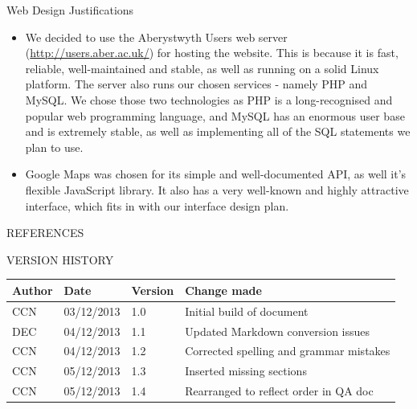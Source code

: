 \documentclass{article}
\newcommand{\versionhistory}{
		\begin{tabularx}{\linewidth}{| p{2cm} | p{2cm} | p{2cm} | X | }
			\hline
			\bf{Author} & \bf{Date} & \bf{Version} & \bf{Change made} \\
			\hline
			CCN & 03/12/2013 & 1.0 & Initial build of document \\
			\hline
			DEC & 04/12/2013 & 1.1 & Updated Markdown conversion issues \\
			\hline
			CCN & 04/12/2013 & 1.2 & Corrected spelling and grammar mistakes \\
			\hline
			CCN & 05/12/2013 & 1.3 & Inserted missing sections \\
			\hline
			CCN & 05/12/2013 & 1.4 & Rearranged to reflect order in QA doc \\
			\hline
		\end{tabularx}
}
\begin{document}
\begin{section}{Web Design Justifications}
	\begin{itemize}
		\item{We decided to use the Aberystwyth Users web server (\href{users.aber.ac.uk}{http://users.aber.ac.uk/}) for hosting the website. This is because it is fast, reliable, well-maintained and stable, as well as running on a solid Linux platform. The server also runs our chosen services - namely PHP and MySQL. We chose those two technologies as PHP is a long-recognised and popular web programming language, and MySQL has an enormous user base and is extremely stable, as well as implementing all of the SQL statements we plan to use.}
		\item{Google Maps was chosen for its simple and well-documented API, as well it's flexible JavaScript library. It also has a very well-known and highly attractive interface, which fits in with our interface design plan.}
	\end{itemize}
\end{section}

\nocite{LaTeXTemplate} %
\nocite{LaTeXListings}
\nocite{LaTeXListings2}
\nocite{LaTeXListings3}
\nocite{JavaScriptReference}
\nocite{AndroidReference}

\newpage
\begin{section}{REFERENCES}
	
	
\end{section}

\vspace{1cm}
\begin{section}{VERSION HISTORY}
	\versionhistory
\end{section}
\end{document}
